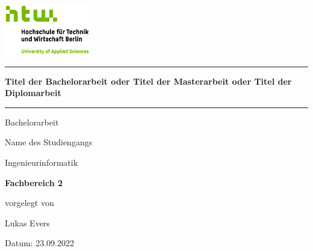 \begin{titlepage}

\begin{center}
\includegraphics[width=0.28\textwidth,keepaspectratio]{images/HTW_Logo_rgb.jpg}
\end{center}

\bigskip
\bigskip 
\bigskip 
\bigskip 

\par\noindent\rule{\textwidth}{0.4pt}

\bigskip 
\bigskip 
\bigskip 
 
\begin{center}
	\begin{Large}
		\color{htwgreen}
		\textbf{Titel der Bachelorarbeit oder Titel der Masterarbeit oder Titel der Diplomarbeit}
	\end{Large}
	
	\bigskip 
	\bigskip 
	\par\noindent\rule{\textwidth}{0.4pt}
	
	\medskip 
	Bachelorarbeit
	\bigskip 
	\bigskip
	\bigskip 
	\bigskip 
	\bigskip 
	\bigskip
	\bigskip 
	\bigskip 

	\bigskip 
	Name des Studiengangs\\
	
	\medskip
	\begin{Large}
		Ingenieurinformatik
	\end{Large}
	
	\bigskip 
	\begin{Large}
		\color{htwgreen}
		\textbf{Fachbereich 2}
	\end{Large}

	\bigskip 
	vorgelegt von \\
		
	\begin{Large}
		Lukas Evers\\
		
	\end{Large}
	
	\bigskip 
	\bigskip 
	\bigskip 
	\bigskip 
	\bigskip 
	\bigskip 
	\bigskip 
	\bigskip 
	\bigskip 
	\bigskip 
	\bigskip 
	\bigskip 
	
	\bigskip 
	\bigskip 
	\bigskip 
	\bigskip 
	\bigskip 
	\bigskip 
	\bigskip 
	\bigskip 
	\bigskip 
	\bigskip 
	\bigskip 
	\bigskip
	Datum:
	23.09.2022\\
	\bigskip
	\bigskip
	\bigskip
	

\end{center}
\end{titlepage}
